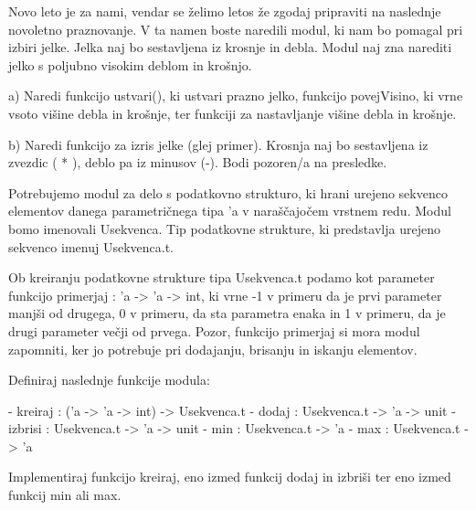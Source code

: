 \begin{ex}
Novo leto je za nami, vendar se \v zelimo letos \v ze zgodaj pripraviti na
naslednje novoletno praznovanje. V ta namen boste naredili modul, ki
nam bo pomagal pri izbiri jelke. Jelka naj bo sestavljena iz krosnje
in debla. Modul naj zna narediti jelko s poljubno visokim deblom in
kro\v snjo.

a) Naredi funkcijo ustvari(), ki ustvari prazno jelko, funkcijo
povejVisino, ki vrne vsoto vi\v sine debla in kro\v snje, ter funkciji za
nastavljanje vi\v sine debla in kro\v snje.

b) Naredi funkcijo za izris jelke (glej primer). Krosnja naj bo
sestavljena iz zvezdic ( * ), deblo pa iz minusov (-). Bodi pozoren/a
na presledke.



\end{ex}
\begin{ex}
Potrebujemo modul za delo s podatkovno strukturo, ki hrani urejeno sekvenco elementov danega parametri\v cnega tipa 'a v nara\v s\v cajo\v cem vrstnem redu. Modul bomo imenovali Usekvenca. Tip podatkovne strukture, ki predstavlja urejeno sekvenco imenuj Usekvenca.t.

Ob kreiranju podatkovne strukture tipa Usekvenca.t podamo kot parameter funkcijo primerjaj : 'a -> 'a -> int, ki vrne -1 v primeru da je prvi parameter manj\v si od drugega, 0 v primeru, da sta parametra enaka in 1 v primeru, da je drugi parameter ve\v cji od prvega. Pozor, funkcijo primerjaj si mora modul zapomniti, ker jo potrebuje pri
dodajanju, brisanju in iskanju elementov.

Definiraj naslednje funkcije modula: 

- kreiraj : ('a -> 'a -> int) -> Usekvenca.t 
- dodaj : Usekvenca.t -> 'a -> unit 
- izbrisi : Usekvenca.t -> 'a -> unit   
- min : Usekvenca.t -> 'a 
- max : Usekvenca.t -> 'a 

Implementiraj funkcijo kreiraj, eno izmed funkcij dodaj in izbri\v si ter
eno izmed funkcij min ali max.



\end{ex}
